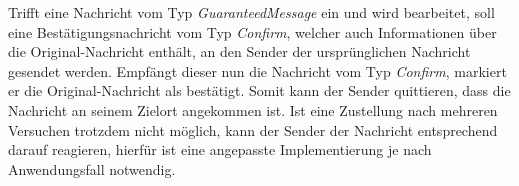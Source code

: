 Trifft eine Nachricht vom Typ \textit{GuaranteedMessage} ein und wird bearbeitet, soll eine Bestätigungsnachricht vom Typ \textit{Confirm}, welcher auch Informationen über die Original-Nachricht enthält, an den Sender der ursprünglichen Nachricht gesendet werden. Empfängt dieser nun die Nachricht vom Typ \textit{Confirm}, markiert er die Original-Nachricht als bestätigt. Somit kann der Sender quittieren, dass die Nachricht an seinem Zielort angekommen ist. Ist eine Zustellung nach mehreren Versuchen trotzdem nicht möglich, kann der Sender der Nachricht entsprechend darauf reagieren, hierfür ist eine angepasste Implementierung je nach Anwendungsfall notwendig. \\
